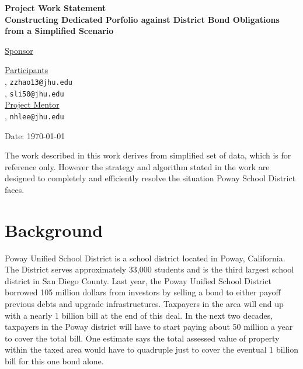 \documentclass[12pt,letterpaper]{article}
\theoremstyle{definition}
\begin{document}
\def\shiftdowna{0.32in}  %
\def\shiftdownb{0.22in}  %


\begin{center}
\textbf{{\large Project Work Statement}}\\


\vspace \shiftdowna
\textbf{{\large Constructing Dedicated Porfolio against District Bond Obligations from a Simplified Scenario}}

\vspace\shiftdownb
\underline{Sponsor}\\
\vspace{5pt}

\vspace \shiftdownb
\underline {Participants} \\
\vspace{5pt}
, \texttt{zzhao13@jhu.edu}\\
, \texttt{sli50@jhu.edu}\\
\vspace \shiftdownb
\underline {Project Mentor}\\
\vspace{5pt}
, \texttt{nhlee@jhu.edu}

\vspace{.50in}
\vspace \shiftdowna
Date: \today

\end{center}

\vfill  
\footnoterule
\noindent \small{The work described in this work derives from simplified set of data, which is for reference only. However the strategy and algorithm stated in the work are designed to completely and efficiently resolve the situation Poway School District faces. }

\newpage

\section{Background} 
Poway Unified School District is a school district located in Poway, California. The District serves approximately 33,000 students and is the third largest school district in San Diego County. Last year, the Poway Unified School District borrowed 105 million dollars from investors by selling a bond to either payoff previous debts and upgrade infrastructures. Taxpayers in the area will end up with a nearly 1 billion bill at the end of this deal. In the next two decades, taxpayers in the Poway district will have to start paying about 50 million a year to cover the total bill. One estimate says the total assessed value of property within the taxed area would have to quadruple just to cover the eventual 1 billion bill for this one bond alone.
\end{document}

